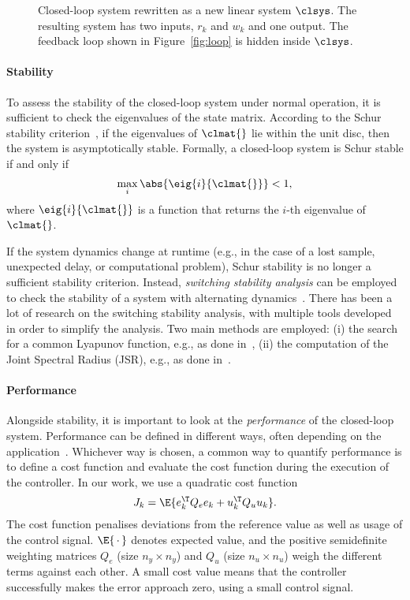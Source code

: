 \begin{figure}[t]
\centering

\caption{Closed-loop system rewritten as a new linear system $\clsys$.
    The resulting system has two inputs, $r_k$ and $w_k$ and one output.
    The feedback loop shown in Figure~\ref{fig:loop} is hidden inside $\clsys$.}
\label{fig:closedloop}
\end{figure}

\paragraph*{Stability}

To assess the stability of the closed-loop system under normal operation, it is sufficient to check the eigenvalues of the state matrix. 
According to the Schur stability criterion~\cite{Astrom:1997}, if the eigenvalues of $\clmat{}$ lie within the unit disc, then the system is asymptotically stable. 
Formally, a closed-loop system is Schur stable if and only if
%
\begin{equation}
    \label{eq:schur}
    \max_i{\abs{\eig{i}{\clmat{}}}} < 1,
\end{equation}
%
where $\eig{i}{\clmat{}}$ is a function that returns the $i$-th eigenvalue of~$\clmat{}$.

If the system dynamics change at runtime (e.g., in the case of a lost sample, unexpected delay, or computational problem), Schur stability is no longer a sufficient stability criterion.
Instead, \emph{switching stability analysis} can be employed to check the stability of a system with alternating dynamics~\cite{Jungers2009}.
There has been a lot of research on the switching stability analysis, with multiple tools developed in order to simplify the analysis.
Two main methods are employed: (i) the search for a common Lyapunov function, e.g., as done in~\cite{Linsenmayer:2017}, (ii) the computation of the Joint Spectral Radius (JSR), e.g., as done in~\cite{Maggio:2020,Jungers:2014}.

\paragraph*{Performance}

Alongside stability, it is important to look at the \emph{performance} of the closed-loop system.
Performance can be defined in different ways, often depending on the application~\cite{Astrom:2006}.
Whichever way is chosen, a common way to quantify performance is to define a cost function and evaluate the cost function during the execution of the controller.
In our work, we use a quadratic cost function
%
\begin{equation}
    \label{eq:cost}
    J_k = \E{e_k^\T Q_e e_k + u_k^\T Q_u u_k}.
\end{equation}
%
The cost function penalises deviations from the reference value as well as usage of the control signal.
$\E{\,\cdot\,}$ denotes expected value, and the positive semidefinite weighting matrices $Q_e$ (size $n_y \times n_y$) and $Q_u$ (size $n_u \times n_u$) weigh the different terms against each other.
A small cost value means that the controller successfully makes the error approach zero, using a small control signal.

